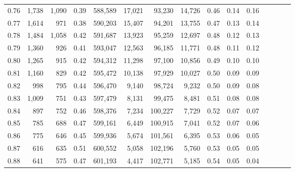 \begin{tabular}{rrrcrrrrrrrrrrr}
0.76 &   1,738 &  1,090 &                                       0.39 &  588,589 &   17,021 &   93,230 &   14,726 &  0.46 &  0.14 &                         0.16 \\
0.77 &   1,614 &    971 &                                       0.38 &  590,203 &   15,407 &   94,201 &   13,755 &  0.47 &  0.13 &                         0.14 \\
0.78 &   1,484 &  1,058 &                                       0.42 &  591,687 &   13,923 &   95,259 &   12,697 &  0.48 &  0.12 &                         0.13 \\
0.79 &   1,360 &    926 &                                       0.41 &  593,047 &   12,563 &   96,185 &   11,771 &  0.48 &  0.11 &                         0.12 \\
0.80 &   1,265 &    915 &                                       0.42 &  594,312 &   11,298 &   97,100 &   10,856 &  0.49 &  0.10 &                         0.10 \\
0.81 &   1,160 &    829 &                                       0.42 &  595,472 &   10,138 &   97,929 &   10,027 &  0.50 &  0.09 &                         0.09 \\
0.82 &     998 &    795 &                                       0.44 &  596,470 &    9,140 &   98,724 &    9,232 &  0.50 &  0.09 &                         0.08 \\
0.83 &   1,009 &    751 &                                       0.43 &  597,479 &    8,131 &   99,475 &    8,481 &  0.51 &  0.08 &                         0.08 \\
0.84 &     897 &    752 &                                       0.46 &  598,376 &    7,234 &  100,227 &    7,729 &  0.52 &  0.07 &                         0.07 \\
0.85 &     785 &    688 &                                       0.47 &  599,161 &    6,449 &  100,915 &    7,041 &  0.52 &  0.07 &                         0.06 \\
0.86 &     775 &    646 &                                       0.45 &  599,936 &    5,674 &  101,561 &    6,395 &  0.53 &  0.06 &                         0.05 \\
0.87 &     616 &    635 &                                       0.51 &  600,552 &    5,058 &  102,196 &    5,760 &  0.53 &  0.05 &                         0.05 \\
0.88 &     641 &    575 &                                       0.47 &  601,193 &    4,417 &  102,771 &    5,185 &  0.54 &  0.05 &                         0.04 \\

\end{tabular}
